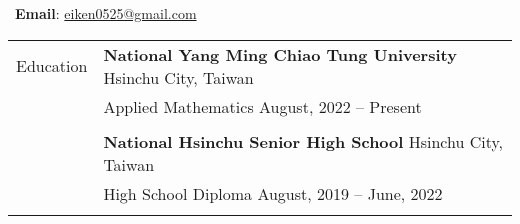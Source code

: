 \documentclass[letterpaper, 11pt]{article}
\begin{document}


\vspace{0.5cm} 
\noindent\quad\ \textbf{Email}: \href{mailto:eiken0525@gmail.com}{eiken0525@gmail.com}


\setlength{\tabcolsep}{8pt}

\begin{longtable}{p{0.8in}p{5.5in}}




\textcolor{OliveGreen}{Education} 
& \textbf{National Yang Ming Chiao Tung University} \hfill Hsinchu City, Taiwan \\ 
& Applied Mathematics \hfill August, 2022 -- Present \\
& \\

& \textbf{National Hsinchu Senior High School} \hfill Hsinchu City, Taiwan \\
& High School Diploma \hfill August, 2019 -- June, 2022\\
& \\




\end{longtable}
\end{document}
